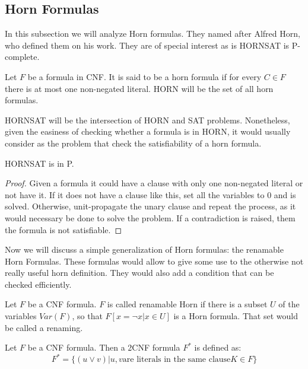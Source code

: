 \subsection{Horn Formulas}

In this subsection we will analyze Horn formulas. They named after Alfred Horn, who defined them on his work\cite{horn1951sentences}. They are of special interest as is HORNSAT is P-complete.


\begin{definition}
  Let $F$ be a formula in CNF. It is said to be a horn formula if for every $C \in F$ there is at most one non-negated literal. HORN will be the set of all horn formulas.

  HORNSAT will be the intersection of HORN and SAT problems. Nonetheless, given the easiness of checking whether a formula is in HORN, it would usually consider as the problem that check the satisfiability of a horn formula.
\end{definition}


\begin{proposition}
  HORNSAT is in P.
\end{proposition}
\begin{proof}
  Given a formula it could have a clause with only one non-negated literal or not have it. If it does not have a clause like this, set all the variables to 0 and is solved. Otherwise, unit-propagate the unary clause and repeat the process, as it would necessary be done to solve the problem. If a contradiction is raised, them the formula is not satisfiable.
\end{proof}


Now we will discuss a simple generalization of Horn formulas: the renamable Horn Formulas. These formulas would allow to give some use to the otherwise not really useful horn definition. They would also add a condition that can be checked efficiently.

\begin{definition}
  Let $F$ be a CNF formula. $F$ is called renamable Horn if there is a subset $U$ of the variables $Var(F)$, so that $F[x=\neg x | x \in U]$ is a Horn formula.
  That set would be called a renaming.
\end{definition}


\begin{definition}
  Let $F$ be a CNF formula. Then a 2CNF formula $F^*$ is defined as:
  $$F^* = \{(u \vee v) | u,v \text{are literals in the same clause} K \in F \}$$
\end{definition}


